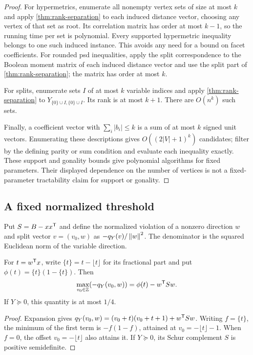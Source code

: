\begin{proof}
For hypermetrics, enumerate all nonempty vertex sets of size at most $k$ and apply
\cref{thm:rank-separation} to each induced distance vector, choosing any
vertex of that set as root. Its correlation matrix has order at most
$k-1$, so the running time per set is polynomial. Every supported
hypermetric inequality belongs to one such induced instance. This avoids
any need for a bound on facet coefficients.
For rounded psd inequalities, apply the split correspondence to the
Boolean moment matrix of each induced distance vector and use the split
part of \cref{thm:rank-separation}; the matrix has order at most $k$.

For splits, enumerate sets $I$ of at most $k$ variable indices and apply
\cref{thm:rank-separation} to $Y_{\{0\}\cup I,\{0\}\cup I}$. Its rank is at
most $k+1$. There are $O(n^k)$ such sets.

Finally, a coefficient vector with $\sum_i|b_i|\le k$ is a sum of at most
$k$ signed unit vectors. Enumerating these descriptions gives
$O((2|V|+1)^k)$ candidates; filter by the defining parity or sum condition
and evaluate each inequality exactly. These support and gonality bounds
give polynomial algorithms for fixed parameters. Their displayed
dependence on the number of vertices is not a fixed-parameter tractability
claim for support or gonality.
\end{proof}

\subsection{A fixed normalized threshold}

Put $S=B-xx^{\mathsf T}$ and define the normalized violation of a nonzero
direction $w$ and split vector $v=(v_0,w)$ as
$-q_Y(v)/\left\lVert w\right\rVert^2$. The denominator is the squared Euclidean norm of
the variable direction.

\begin{lemma}\label{lem:best-split-offset}
For $t=w^{\mathsf T} x$, write $\{t\}=t-\lfloor t\rfloor$ for its fractional
part and put $\phi(t)=\{t\}(1-\{t\})$. Then
\[
 \max_{v_0\in\mathbb Z}(-q_Y(v_0,w))
 =\phi(t)-w^{\mathsf T} Sw.
\]
If $Y\succeq0$, this quantity is at most $1/4$.
\end{lemma}

\begin{proof}
Expansion gives
$q_Y(v_0,w)=(v_0+t)(v_0+t+1)+w^{\mathsf T} Sw$.
Writing $f=\{t\}$, the minimum of the first term is $-f(1-f)$,
attained at $v_0=-\lfloor t\rfloor-1$. When $f=0$, the offset
$v_0=-\lfloor t\rfloor$ also attains it. If $Y\succeq0$, its Schur
complement $S$ is positive semidefinite.
\end{proof}

